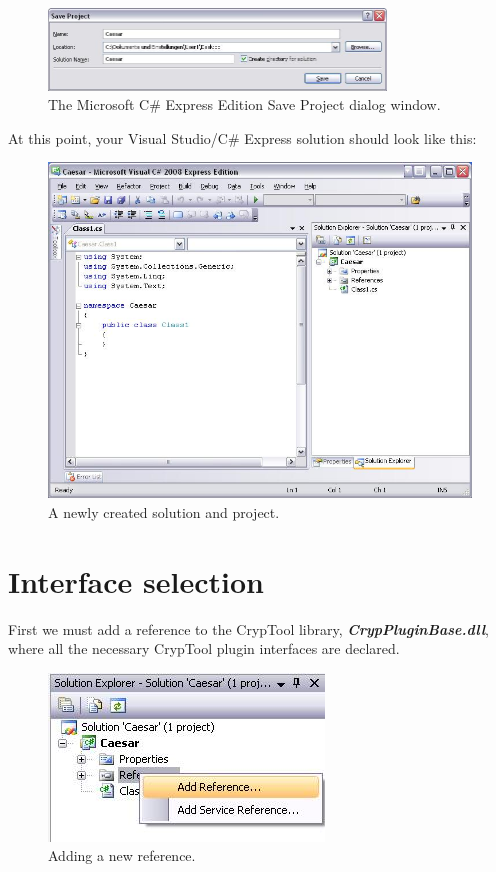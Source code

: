 \begin{figure}[h!]
	\centering
		\includegraphics[width=0.80\textwidth]{figures/save_solution_csharp_express.JPG}
	\caption{The Microsoft C\# Express Edition Save Project dialog window.}
	\label{fig:save_solution_csharp_express}
\end{figure}

At this point, your Visual Studio\slash C\# Express solution should look like this:

\begin{figure}[h!]
	\centering
		\includegraphics[width=1.00\textwidth]{figures/solution_start_up.jpg}
	\caption{A newly created solution and project.}
	\label{fig:solution_start_up}
\end{figure}
\clearpage

\section{Interface selection}
\label{sec:InterfaceSelection}

First we must add a reference to the CrypTool library, \textbf{\textit{CrypPluginBase.dll}}, where all the necessary CrypTool plugin interfaces are declared.

\begin{figure}[h!]
	\includegraphics{figures/add_reference.jpg}
	\caption{Adding a new reference.}
	\label{fig:add_reference}
\end{figure}

